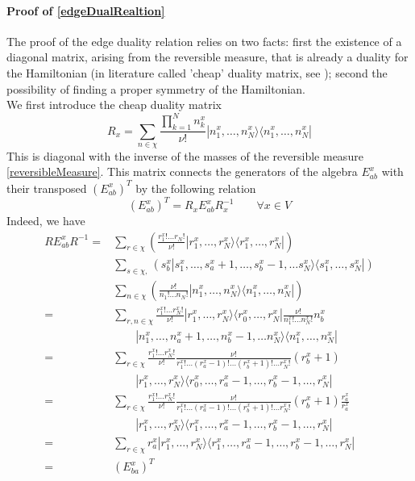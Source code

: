 \documentclass[11pt]{article}
\numberwithin{equation}{section}
\numberwithin{equation}{subsection}
\begin{document}
\paragraph{Proof of \eqref{edgeDualRealtion}}
The proof of the edge duality relation relies on two facts: first the existence of a diagonal matrix, arising from the reversible measure, that is already a duality for the Hamiltonian (in literature called 'cheap' duality matrix, see \cite{giardina2009duality}); second the possibility of finding a proper symmetry of the Hamiltonian.  \\We first introduce the cheap duality matrix 
\begin{equation}\label{transpositionPropertyR}
R_{x}=\sum_{n\in\chi}\frac{\prod_{k=1}^{N}n_{k}^{x}}{\nu!}|n_{1}^{x},\ldots,n_{N}^{x}\rangle\langle n_{1}^{x},\ldots,n_{N}^{x}|
\end{equation}
This is diagonal with the inverse of the masses of the reversible measure \eqref{reversibleMeasure}. 
This matrix connects the generators of the algebra $E^{x}_{ab}$ with their transposed $(E_{ab}^{x})^{T}$ by the following relation
\begin{equation}
(E_{ab}^{x})^{T}=R_{x}E_{ab}^{x}R_{x}^{-1}\qquad \forall x\in V
\end{equation}
Indeed, we have
\begin{align*}
RE_{ab}^{x}R^{-1}=&\sum_{r\in\chi}\left(\frac{r_{1}^{x}!\ldots r_{N}!}{\nu!}|r_{1}^{x},\ldots,r_{N}^{x}\rangle \langle r_{1}^{x},\ldots, r_{N}^{x}|\right)
	\\&
	\sum_{s\in \chi,}\left(s_{b}^{x}|s_{1}^{x},\ldots,s_{a}^{x}+1,\ldots,s_{b}^{x}-1,\ldots s_{N}^{x}\rangle \langle s_{1}^{x},\ldots,s_{N}^{x}|\right)
	\\&
	\sum_{n\in\chi}\left(\frac{\nu!}{n_{1}!\ldots n_{N}!}|n_{1}^{x},\ldots,n_{N}^{x}\rangle \langle n_{1}^{x},\ldots, n_{N}^{x}|\right)
	\\=&
	\sum_{r,n\in \chi}\frac{r_{1}^{x}!\ldots r_{N}^{x}!}{\nu!}|r_{1}^{x},\ldots,r_{N}^{x}\rangle \langle r_{0}^{x},\ldots, r_{N}^{x}|
	\frac{\nu!}{n_{1}^{x}!\ldots n_{N}^{x}!}n_{b}^{x}
 \\&
 \qquad |n_{1}^{x},\ldots,n_{a}^{x}+1,\ldots,n_{b}^{x}-1,\ldots n_{N}^{x}\rangle \langle n_{1}^{x},\ldots,n_{N}^{x}|
 \\=&
 \sum_{r\in \chi}\frac{r_{1}^{x}!\ldots r_{N}^{x}!}{\nu!}\frac{\nu!}{r_{1}^{x}!\ldots (r_{a}^{x}-1)!\ldots(r_{b}^{x}+1)!\ldots r_{N}^{x}!}(r_{b}^{x}+1)
 \\&\qquad
 |r_{1}^{x},\ldots,r_{N}^{x}\rangle \langle r_{0}^{x},\ldots,r_{a}^{x}-1,\ldots,r_{b}^{x}-1,\ldots,r_{N}^{x}|
	\\=&\sum_{r\in\chi}\frac{r_{1}^{x}!\ldots r_{N}^{x}!}{\nu!}\frac{\nu!}{r_{1}^{x}!\ldots (r_{a}^{x}-1)!\ldots(r_{b}^{x}+1)!\ldots r_{N}^{x}!}(r_{b}^{x}+1)\frac{r_{a}^{x}}{r_{a}^{x}}
 \\& \qquad
 |r_{1}^{x},\ldots,r_{N}^{x}\rangle \langle r_{1}^{x},\ldots,r_{a}^{x}-1,\ldots,r_{b}^{x}-1,\ldots,r_{N}^{x}|
	\\=&\sum_{r\in \chi}
	r_{a}^{x}|r_{1}^{x},\ldots,r_{N}^{x}\rangle \langle r_{1}^{x},\ldots,r_{a}^{x}-1,\ldots,r_{b}^{x}-1,\ldots,r_{N}^{x}|
	\\=&
	\left(E_{ba}^{x}\right)^{T}
\end{align*}
\end{document}
